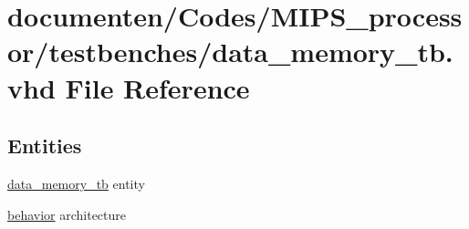 \hypertarget{data__memory__tb_8vhd}{\section{documenten/\-Codes/\-M\-I\-P\-S\-\_\-processor/testbenches/data\-\_\-memory\-\_\-tb.vhd File Reference}
\label{data__memory__tb_8vhd}
}
\subsection*{Entities}
\begin{DoxyCompactItemize}
\item 
\hyperlink{classdata__memory__tb}{data\-\_\-memory\-\_\-tb} entity
\item 
\hyperlink{classdata__memory__tb_1_1behavior}{behavior} architecture
\end{DoxyCompactItemize}

